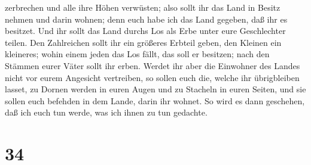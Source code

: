 zerbrechen und alle ihre Höhen verwüsten;  also sollt ihr
das Land in Besitz nehmen und darin wohnen; denn euch habe ich das Land
gegeben, daß ihr es besitzet.  Und ihr sollt das Land
durchs Los als Erbe unter eure Geschlechter teilen. Den Zahlreichen
sollt ihr ein größeres Erbteil geben, den Kleinen ein kleineres; wohin
einem jeden das Los fällt, das soll er besitzen; nach den Stämmen eurer
Väter sollt ihr erben.  Werdet ihr aber die Einwohner des
Landes nicht vor eurem Angesicht vertreiben, so sollen euch die, welche
ihr übrigbleiben lasset, zu Dornen werden in euren Augen und zu Stacheln
in euren Seiten, und sie sollen euch befehden in dem Lande, darin ihr
wohnet.  So wird es dann geschehen, daß ich euch tun
werde, was ich ihnen zu tun gedachte.

\hypertarget{section-33}{%
\section{34}\label{section-33}}

